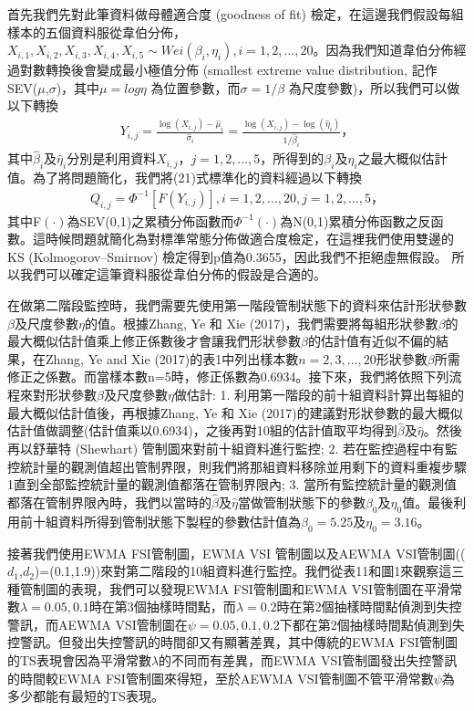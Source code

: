 \documentclass[12pt]{article}  %
\theoremstyle{plain}
\begin{document}
首先我們先對此筆資料做母體適合度 (goodness of fit) 檢定，在這邊我們假設每組樣本的五個資料服從韋伯分佈，$X_{i,1},X_{i,2},X_{i,3},X_{i,4},X_{i,5} \sim Wei(\beta_i,\eta_i),i = 1,2,\ldots,20$。因為我們知道韋伯分佈經過對數轉換後會變成最小極值分佈 (smallest extreme value distribution, 記作SEV($\mu$,$\sigma$)，其中$\mu=log\eta$ 為位置參數，而$\sigma=1/\beta$ 為尺度參數)，所以我們可以做以下轉換
\begin{align}
Y_{i, j}=\frac{\log \left(X_{i, j}\right)-\hat{\mu}_{i}}{\hat{\sigma}_{i}}=\frac{\log \left(X_{i, j}\right)-\log \left(\hat{\eta}_{i}\right)}{1 / \hat{\beta}_{i}} \mbox{，}
\end{align}
其中$\hat{\beta}_i$及$\hat{\eta}_i$分別是利用資料$X_{i,j}$，$j=1,2,\ldots,5$，所得到的$\beta_i$及$\eta_i$之最大概似估計值。為了將問題簡化，我們將(21)式標準化的資料經過以下轉換
\begin{align}
Q_{i, j}=\Phi^{-1}\left[F\left(Y_{i, j}\right)\right], i=1,2, \ldots, 20, j=1,2, \ldots, 5 \mbox{，}
\end{align}
其中F$(\cdot)$為SEV(0,1)之累積分佈函數而$\Phi^{-1}(\cdot)$為N(0,1)累積分佈函數之反函數。這時候問題就簡化為對標準常態分佈做適合度檢定，在這裡我們使用雙邊的KS (Kolmogorov–Smirnov) 檢定得到p值為0.3655，因此我們不拒絕虛無假設。
所以我們可以確定這筆資料服從韋伯分佈的假設是合適的。

在做第二階段監控時，我們需要先使用第一階段管制狀態下的資料來估計形狀參數$\beta$及尺度參數$\eta$的值。根據Zhang, Ye 和 Xie (2017)，我們需要將每組形狀參數$\beta$的最大概似估計值乘上修正係數後才會讓我們形狀參數$\beta$的估計值有近似不偏的結果，在Zhang, Ye and Xie (2017)的表1中列出樣本數$n=2,3,\ldots,20$形狀參數$\beta$所需修正之係數。而當樣本數n=5時，修正係數為0.6934。接下來，我們將依照下列流程來對形狀參數$\beta$及尺度參數$\eta$做估計: 1. 利用第一階段的前十組資料計算出每組的最大概似估計值後，再根據Zhang, Ye 和 Xie (2017)的建議對形狀參數的最大概似估計值做調整(估計值乘以0.6934)，之後再對10組的估計值取平均得到$\hat{\beta}$及$\hat{\eta}$。然後再以舒華特 (Shewhart) 管制圖來對前十組資料進行監控; 2. 若在監控過程中有監控統計量的觀測值超出管制界限，則我們將那組資料移除並用剩下的資料重複步驟1直到全部監控統計量的觀測值都落在管制界限內; 3. 當所有監控統計量的觀測值都落在管制界限內時，我們以當時的$\hat{\beta}$及$\hat{\eta}$當做管制狀態下的參數$\beta_0$及$\eta_0$值。最後利用前十組資料所得到管制狀態下製程的參數估計值為$\beta_0=5.25$及$\eta_0=3.16$。

接著我們使用EWMA FSI管制圖，EWMA VSI 管制圖以及AEWMA VSI管制圖(($d_1$,$d_2$)=(0.1,1.9))來對第二階段的10組資料進行監控。我們從表11和圖1來觀察這三種管制圖的表現，我們可以發現EWMA FSI管制圖和EWMA VSI管制圖在平滑常數$\lambda=0.05,0.1$時在第3個抽樣時間點，而$\lambda=0.2$時在第2個抽樣時間點偵測到失控警訊，而AEWMA VSI管制圖在$\psi=0.05,0.1,0.2$下都在第2個抽樣時間點偵測到失控警訊。但發出失控警訊的時間卻又有顯著差異，其中傳統的EWMA FSI管制圖的TS表現會因為平滑常數$\lambda$的不同而有差異，而EWMA VSI管制圖發出失控警訊的時間較EWMA FSI管制圖來得短，至於AEWMA VSI管制圖不管平滑常數$\psi$為多少都能有最短的TS表現。
\end{document}
